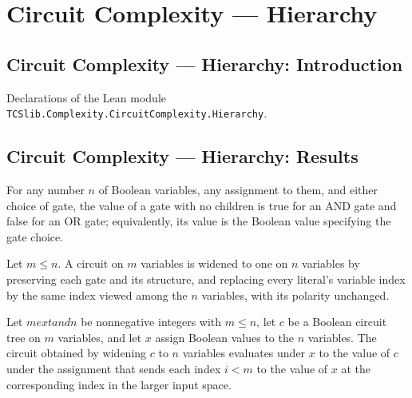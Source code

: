 \section{Circuit Complexity --- Hierarchy}
\subsection*{Circuit Complexity --- Hierarchy: Introduction}

Declarations of the Lean module \texttt{TCSlib.Complexity.CircuitComplexity.Hierarchy}.

\subsection*{Circuit Complexity --- Hierarchy: Results}

\begin{theorem}
\label{BoolCircuit.eval_node_nil}
\leanok
{}
For any number $n$ of Boolean variables, any assignment to them, and either choice of
gate, the value of a gate with no children is true for an AND gate and false for an OR
gate; equivalently, its value is the Boolean value specifying the gate choice.
\end{theorem}

\begin{definition}
\label{BoolCircuit.widenCircuit}
\leanok
{}
Let $m\le n$. A circuit on $m$ variables is widened to one on $n$ variables by
preserving each gate and its structure, and replacing every literal's variable index by
the same index viewed among the $n$ variables, with its polarity unchanged.
\end{definition}

\begin{theorem}
\label{BoolCircuit.widenCircuit_eval}
\leanok
{}
Let $m	ext{ and }n$ be nonnegative integers with $m\le n$, let $c$ be a Boolean circuit
tree on $m$ variables, and let $x$ assign Boolean values to the $n$ variables. The
circuit obtained by widening $c$ to $n$ variables evaluates under $x$ to the value of
$c$ under the assignment that sends each index $i<m$ to the value of $x$ at the
corresponding index in the larger input space.
\end{theorem}

